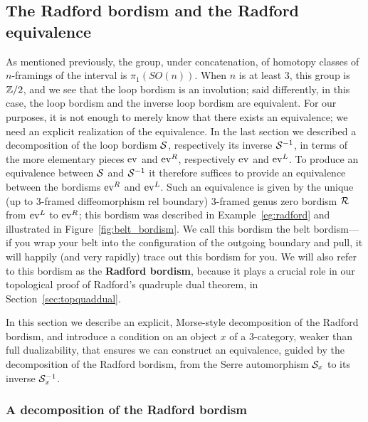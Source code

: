 \documentclass{amsart}
\begin{document}
\subsection{The Radford bordism and the Radford equivalence}


As mentioned previously, the group, under concatenation, of homotopy classes of $n$-framings of the interval is $\pi_1(SO(n))$.  When $n$ is at least 3, this group is $\mathbb Z/2$, and we see that the loop bordism is an involution; said differently, in this case, the loop bordism and the inverse loop bordism are equivalent.  For our purposes, it is not enough to merely know that there exists an equivalence; we need an explicit realization of the equivalence.  In the last section we described a decomposition of the loop bordism $\mathcal S$, respectively its inverse $\mathcal S^{-1}$, in terms of the more elementary pieces $\mathrm{ev}$ and $\mathrm{ev}^R$, respectively $\mathrm{ev}$ and $\mathrm{ev}^L$.   To produce an equivalence between $\mathcal S$ and $\mathcal S^{-1}$ it therefore suffices to provide an equivalence between the bordisms $\mathrm{ev}^R$ and $\mathrm{ev}^L$.  Such an equivalence is given by the unique (up to 3-framed diffeomorphism rel boundary) 3-framed genus zero bordism $\mathcal R$ from $\mathrm{ev}^L$ to $\mathrm{ev}^R$; this bordism was described in Example~\ref{eg:radford} and illustrated in Figure~\ref{fig:belt_bordism}.  We call this bordism the belt bordism---if you wrap your belt into the configuration of the outgoing boundary and pull, it will happily (and very rapidly) trace out this bordism for you.  We will also refer to this bordism as the {\bfseries Radford bordism}, because it plays a crucial role in our topological proof of Radford's quadruple dual theorem, in Section~\ref{sec:topquaddual}.

In this section we describe an explicit, Morse-style decomposition of the Radford bordism, and introduce a condition on an object $x$ of a 3-category, weaker than full dualizability, that ensures we can construct an equivalence, guided by the decomposition of the Radford bordism, from the Serre automorphism $\mathcal S_x$ to its inverse $\mathcal S_x^{-1}$.

\subsubsection{A decomposition of the Radford bordism}
\end{document}
